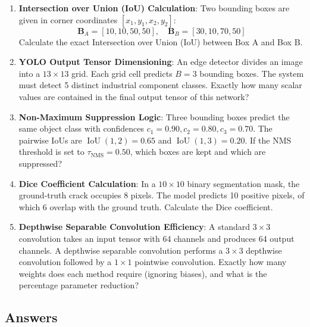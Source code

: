\begin{checkyourself}
\begin{enumerate}
    \item \textbf{Intersection over Union (IoU) Calculation}: Two bounding boxes are given in corner coordinates $[x_1, y_1, x_2, y_2]$:
    \begin{equation*}
    \mathbf{B}_A = [10, 10, 50, 50], \quad \mathbf{B}_B = [30, 10, 70, 50]
    \end{equation*}
    Calculate the exact Intersection over Union (IoU) between Box A and Box B.
    \item \textbf{YOLO Output Tensor Dimensioning}: An edge detector divides an image into a $13 \times 13$ grid. Each grid cell predicts $B = 3$ bounding boxes. The system must detect 5 distinct industrial component classes. Exactly how many scalar values are contained in the final output tensor of this network?
    \item \textbf{Non-Maximum Suppression Logic}: Three bounding boxes predict the same object class with confidences $c_1 = 0.90, c_2 = 0.80, c_3 = 0.70$. The pairwise IoUs are $\operatorname{IoU}(1, 2) = 0.65$ and $\operatorname{IoU}(1, 3) = 0.20$. If the NMS threshold is set to $\tau_{\text{NMS}} = 0.50$, which boxes are kept and which are suppressed?
    \item \textbf{Dice Coefficient Calculation}: In a $10 \times 10$ binary segmentation mask, the ground-truth crack occupies 8 pixels. The model predicts 10 positive pixels, of which 6 overlap with the ground truth. Calculate the Dice coefficient.
    \item \textbf{Depthwise Separable Convolution Efficiency}: A standard $3 \times 3$ convolution takes an input tensor with 64 channels and produces 64 output channels. A depthwise separable convolution performs a $3 \times 3$ depthwise convolution followed by a $1 \times 1$ pointwise convolution. Exactly how many weights does each method require (ignoring biases), and what is the percentage parameter reduction?
\end{enumerate}
\end{checkyourself}

\subsection*{Answers}\label{subsec:answers}

